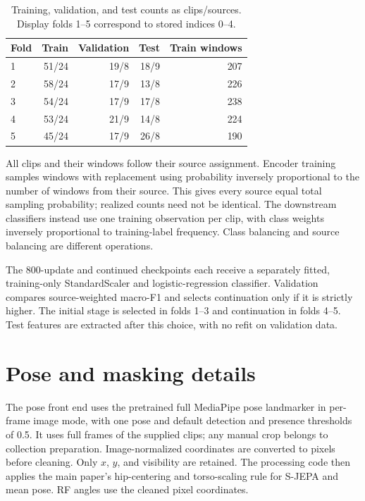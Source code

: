 \documentclass[10pt,twocolumn,letterpaper]{article}
\begin{document}
\begin{table}[t]
\centering
\caption{Training, validation, and test counts as clips/sources. Display folds 1--5 correspond to stored indices 0--4.}
\label{tab:split}
\small\setlength{\tabcolsep}{5pt}
\begin{tabular}{lrrrr}
\toprule
Fold & Train & Validation & Test & Train windows\\
\midrule
1 &51/24&19/8&18/9&207\\
2 &58/24&17/9&13/8&226\\
3 &54/24&17/9&17/8&238\\
4 &53/24&21/9&14/8&224\\
5 &45/24&17/9&26/8&190\\
\bottomrule
\end{tabular}
\end{table}

All clips and their windows follow their source assignment. Encoder training samples windows with replacement using probability inversely proportional to the number of windows from their source. This gives every source equal total sampling probability; realized counts need not be identical. The downstream classifiers instead use one training observation per clip, with class weights inversely proportional to training-label frequency. Class balancing and source balancing are different operations.

The 800-update and continued checkpoints each receive a separately fitted, training-only StandardScaler and logistic-regression classifier. Validation compares source-weighted macro-F1 and selects continuation only if it is strictly higher. The initial stage is selected in folds 1--3 and continuation in folds 4--5. Test features are extracted after this choice, with no refit on validation data.

\section{Pose and masking details}
The pose front end uses the pretrained full MediaPipe pose landmarker in per-frame image mode, with one pose and default detection and presence thresholds of 0.5. It uses full frames of the supplied clips; any manual crop belongs to collection preparation. Image-normalized coordinates are converted to pixels before cleaning. Only $x$, $y$, and visibility are retained. The processing code then applies the main paper's hip-centering and torso-scaling rule for S-JEPA and mean pose. RF angles use the cleaned pixel coordinates.
\end{document}

